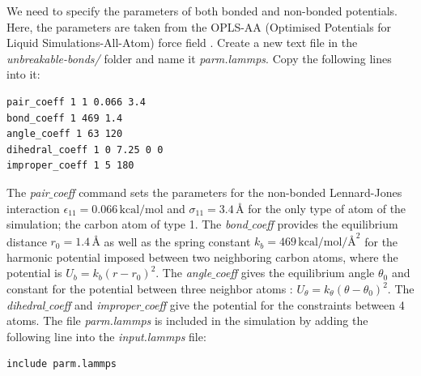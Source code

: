 \documentclass[9pt,tutorial]{livecoms}
\begin{document}
We need to specify the parameters of both bonded and non-bonded potentials. Here, the parameters are taken from the OPLS-AA (Optimised Potentials for Liquid Simulations-All-Atom) force field \cite{jorgensenDevelopmentTestingOPLS1996}. Create a new text file in the \textit{unbreakable-bonds/} folder and name it \textit{parm.lammps}. Copy the following lines into it:
{\normalsize \begin{verbatim}
pair_coeff 1 1 0.066 3.4
bond_coeff 1 469 1.4
angle_coeff 1 63 120
dihedral_coeff 1 0 7.25 0 0
improper_coeff 1 5 180
\end{verbatim}}
The \textit{pair$\_$coeff} command sets the parameters for the non-bonded Lennard-Jones interaction $\epsilon_{11} = 0.066 \, \text{kcal/mol}$ and $\sigma_{11} = 3.4 \, \text{Å}$ for the only type of atom of the simulation; the carbon atom of type 1.  The \textit{bond$\_$coeff} provides the equilibrium distance $r_0= 1.4 \, \text{Å}$ as well as the spring constant $k_b = 469 \, \text{kcal/mol/Å}^2$ for the harmonic potential imposed between two neighboring carbon atoms, where the potential is $U_b = k_b ( r - r_0)^2$. The
\textit{angle$\_$coeff} gives the equilibrium angle $\theta_0$ and constant for the potential between three neighbor atoms :
$U_\theta = k_\theta ( \theta - \theta_0)^2$. The \textit{dihedral$\_$coeff} and \textit{improper$\_$coeff} give the potential for the constraints between 4 atoms. The file \textit{parm.lammps} is included in the simulation by adding the following line into the \textit{input.lammps} file:
{\normalsize \begin{verbatim}
include parm.lammps
\end{verbatim}}
\end{document}
